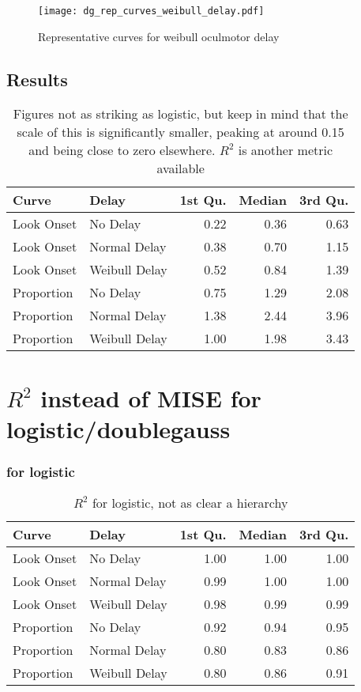 \begin{figure}[H]
\centering
\texttt{[image: dg\_rep\_curves\_weibull\_delay.pdf]}
\caption{Representative curves for weibull oculmotor delay}
\label{fig:dg_rep_curves_weibull_delay}
\end{figure}
\subsection{Results}

\begin{table}[ht]
\centering
\begin{tabular}{llrrr}
  \hline
Curve & Delay & 1st Qu. & Median & 3rd Qu. \\ 
  \hline
Look Onset & No Delay & 0.22 & 0.36 & 0.63 \\ 
  Look Onset & Normal Delay & 0.38 & 0.70 & 1.15 \\ 
  Look Onset & Weibull Delay & 0.52 & 0.84 & 1.39 \\ 
  Proportion & No Delay & 0.75 & 1.29 & 2.08 \\ 
  Proportion & Normal Delay & 1.38 & 2.44 & 3.96 \\ 
  Proportion & Weibull Delay & 1.00 & 1.98 & 3.43 \\ 
   \hline
\end{tabular}
\caption{Figures not as striking as logistic, but keep in mind that the scale of this is significantly smaller, peaking at around 0.15 and being close to zero elsewhere. $R^2$ is another metric available}
\label{tab:dg_mise_sims}
\end{table}

\section{$R^2$ instead of MISE for logistic/doublegauss}


\subsubsection{for logistic}

\begin{table}[H]
\centering
\begin{tabular}{llrrr}
  \hline
Curve & Delay & 1st Qu. & Median & 3rd Qu. \\ 
  \hline
Look Onset & No Delay & 1.00 & 1.00 & 1.00 \\ 
  Look Onset & Normal Delay & 0.99 & 1.00 & 1.00 \\ 
  Look Onset & Weibull Delay & 0.98 & 0.99 & 0.99 \\ 
  Proportion & No Delay & 0.92 & 0.94 & 0.95 \\ 
  Proportion & Normal Delay & 0.80 & 0.83 & 0.86 \\ 
  Proportion & Weibull Delay & 0.80 & 0.86 & 0.91 \\ 
   \hline
\end{tabular}
\caption{$R^2$ for logistic, not as clear a hierarchy}
\label{tab:r2_logistic_sims}
\end{table}

